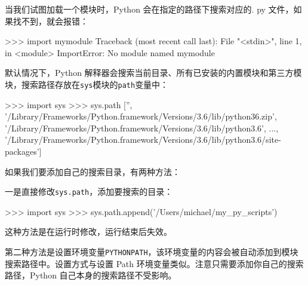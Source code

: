 当我们试图加载一个模块时，Python 会在指定的路径下搜索对应的. py
文件，如果找不到，就会报错：

\begin{pythoncode}
>>> import mymodule
Traceback (most recent call last):
  File "<stdin>", line 1, in <module>
ImportError: No module named mymodule
\end{pythoncode}

默认情况下，Python
解释器会搜索当前目录、所有已安装的内置模块和第三方模块，搜索路径存放在\texttt{sys}模块的\texttt{path}变量中：

\begin{pythoncode}
>>> import sys
>>> sys.path
['', '/Library/Frameworks/Python.framework/Versions/3.6/lib/python36.zip', '/Library/Frameworks/Python.framework/Versions/3.6/lib/python3.6', ..., '/Library/Frameworks/Python.framework/Versions/3.6/lib/python3.6/site-packages']
\end{pythoncode}

如果我们要添加自己的搜索目录，有两种方法：

一是直接修改\texttt{sys.path}，添加要搜索的目录：

\begin{pythoncode}
>>> import sys
>>> sys.path.append('/Users/michael/my_py_scripts')
\end{pythoncode}

这种方法是在运行时修改，运行结束后失效。

第二种方法是设置环境变量\texttt{PYTHONPATH}，该环境变量的内容会被自动添加到模块搜索路径中。设置方式与设置
Path 环境变量类似。注意只需要添加你自己的搜索路径，Python
自己本身的搜索路径不受影响。

